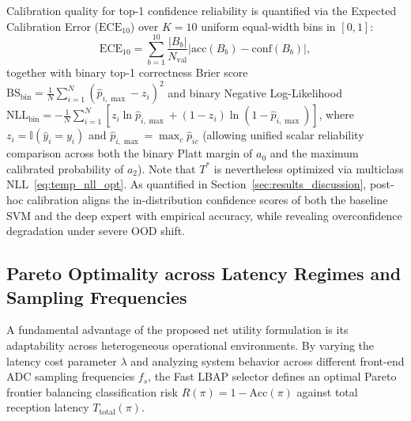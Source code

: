 Calibration quality for top-1 confidence reliability is quantified via the Expected Calibration Error ($\mathrm{ECE}_{10}$) over $K=10$ uniform equal-width bins in $[0, 1]$:
\begin{equation}
    \mathrm{ECE}_{10} = \sum_{b=1}^{10} \frac{|B_b|}{N_{\mathrm{val}}} \left| \mathrm{acc}(B_b) - \mathrm{conf}(B_b) \right|,
    \label{eq:ece_def}
\end{equation}
together with binary top-1 correctness Brier score $\mathrm{BS}_{\mathrm{bin}} = \frac{1}{N} \sum_{i=1}^N (\hat{p}_{i,\max} - z_i)^2$ and binary Negative Log-Likelihood $\mathrm{NLL}_{\mathrm{bin}} = -\frac{1}{N}\sum_{i=1}^N [z_i \ln \hat{p}_{i,\max} + (1 - z_i)\ln(1 - \hat{p}_{i,\max})]$, where $z_i = \mathbb{I}(\hat{y}_i = y_i)$ and $\hat{p}_{i,\max} = \max_c \hat{p}_{ic}$ (allowing unified scalar reliability comparison across both the binary Platt margin of $a_0$ and the maximum calibrated probability of $a_2$). Note that $T^*$ is nevertheless optimized via multiclass NLL~\eqref{eq:temp_nll_opt}. As quantified in Section~\ref{sec:results_discussion}, post-hoc calibration aligns the in-distribution confidence scores of both the baseline SVM and the deep expert with empirical accuracy, while revealing overconfidence degradation under severe OOD shift.

\subsection{Pareto Optimality across Latency Regimes and Sampling Frequencies}
\label{subsec:pareto_formulation}

A fundamental advantage of the proposed net utility formulation is its adaptability across heterogeneous operational environments. By varying the latency cost parameter $\lambda$ and analyzing system behavior across different front-end ADC sampling frequencies $f_s$, the Fast LBAP selector defines an optimal Pareto frontier balancing classification risk $R(\pi) = 1 - \mathrm{Acc}(\pi)$ against total reception latency $T_{\mathrm{total}}(\pi)$.

